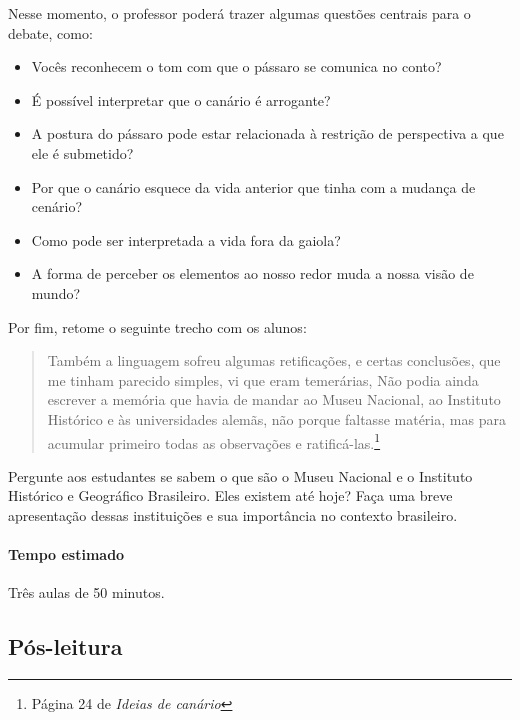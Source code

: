 \documentclass[11pt]{extarticle}
\begin{document}
Nesse momento, o professor poderá trazer algumas questões centrais para o debate, como:

\begin{itemize}

\item Vocês reconhecem o tom com que o pássaro se comunica no conto? 

\item É possível interpretar que o canário é arrogante? 

\item A postura do pássaro pode estar relacionada à restrição de perspectiva a que ele é submetido?

\item Por que o canário esquece da vida anterior que tinha com a mudança de cenário?

\item Como pode ser interpretada a vida fora da gaiola?

\item A forma de perceber os elementos ao nosso redor muda a nossa visão de mundo?

\end{itemize}

Por fim, retome o seguinte trecho com os alunos:

\begin{quote}Também a linguagem sofreu algumas retificações, e certas conclusões, que me tinham parecido simples, vi que eram temerárias, Não podia ainda escrever a memória que havia de mandar ao Museu Nacional, ao Instituto Histórico e às universidades alemãs, não porque faltasse matéria, mas para acumular primeiro todas as observações e ratificá-las.\footnote{Página 24 de \textit{Ideias de canário}}\end{quote} 


Pergunte aos estudantes se sabem o que são o Museu Nacional e o Instituto Histórico e Geográfico Brasileiro. Eles existem até hoje? Faça uma breve apresentação dessas instituições e sua importância no contexto brasileiro.

\paragraph{Tempo estimado} Três aulas de 50 minutos.

\subsection{Pós-leitura}
\end{document}
